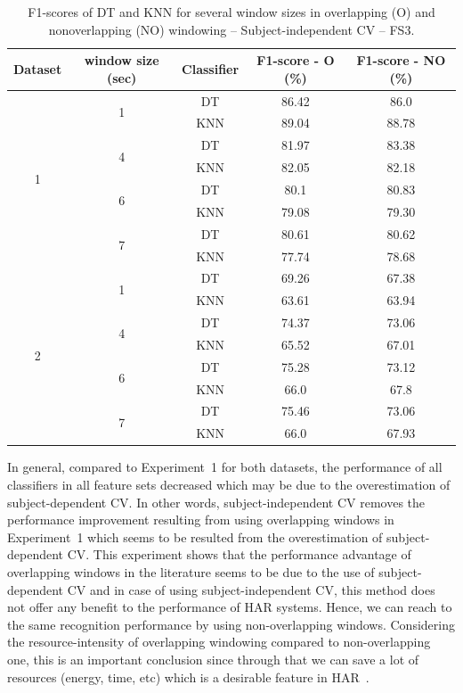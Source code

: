 \begin{table}[]
    \centering
\begin{tabular}{|>{}c|>{}c|>{}c|>{}c|>{}c|}
\hline 
Dataset & window size (sec) & Classifier & F1-score - O (\%) & F1-score - NO (\%)\tabularnewline
\hline 
\multirow{8}{*}{1} & \multirow{2}{*}{1} & DT & 86.42 & 86.0\tabularnewline
\cline{3-5} \cline{4-5} \cline{5-5} 
 &  & KNN & 89.04 & 88.78\tabularnewline
\cline{2-5} \cline{3-5} \cline{4-5} \cline{5-5} 
 & \multirow{2}{*}{4} & DT & 81.97 & 83.38\tabularnewline
\cline{3-5} \cline{4-5} \cline{5-5} 
 &  & KNN & 82.05 & 82.18\tabularnewline
\cline{2-5} \cline{3-5} \cline{4-5} \cline{5-5} 
 & \multirow{2}{*}{6} & DT & 80.1 & 80.83\tabularnewline
\cline{3-5} \cline{4-5} \cline{5-5} 
 &  & KNN & 79.08 & 79.30\tabularnewline
\cline{2-5} \cline{3-5} \cline{4-5} \cline{5-5} 
 & \multirow{2}{*}{7} & DT & 80.61 & 80.62\tabularnewline
\cline{3-5} \cline{4-5} \cline{5-5} 
 &  & KNN & 77.74 & 78.68\tabularnewline
\hline 
\multirow{8}{*}{2} & \multirow{2}{*}{1} & DT & 69.26 & 67.38\tabularnewline
\cline{3-5} \cline{4-5} \cline{5-5} 
 &  & KNN & 63.61 & 63.94\tabularnewline
\cline{2-5} \cline{3-5} \cline{4-5} \cline{5-5} 
 & \multirow{2}{*}{4} & DT & 74.37 & 73.06\tabularnewline
\cline{3-5} \cline{4-5} \cline{5-5} 
 &  & KNN & 65.52 & 67.01\tabularnewline
\cline{2-5} \cline{3-5} \cline{4-5} \cline{5-5} 
 & \multirow{2}{*}{6} & DT & 75.28 & 73.12\tabularnewline
\cline{3-5} \cline{4-5} \cline{5-5} 
 &  & KNN & 66.0 & 67.8\tabularnewline
\cline{2-5} \cline{3-5} \cline{4-5} \cline{5-5} 
 & \multirow{2}{*}{7} & DT & 75.46 & 73.06\tabularnewline
\cline{3-5} \cline{4-5} \cline{5-5} 
 &  & KNN & 66.0 & 67.93\tabularnewline
\hline 
\end{tabular}


    \caption{F1-scores of DT and KNN for several window sizes in overlapping (O) and nonoverlapping (NO) windowing -- Subject-independent CV -- FS3.}
    \label{tab:ds-fs3-f1score}
\end{table}

In general, compared to Experiment~1 for both datasets, the performance of all classifiers in all feature sets decreased which may be due to the overestimation of subject-dependent CV. In other words, subject-independent CV removes the performance improvement resulting from using overlapping windows in Experiment~1 which seems to be resulted from the overestimation of subject-dependent CV. This experiment shows that the performance advantage of overlapping windows in the literature seems to be due to the use of subject-dependent CV and in case of using subject-independent CV, this method does not offer any benefit to the performance of HAR systems. Hence, we can reach to the same recognition performance by using non-overlapping windows. Considering the resource-intensity of overlapping windowing compared to non-overlapping one,  this is an important conclusion since through that we can save a lot of resources (energy, time, etc) which is a desirable feature in HAR~\cite{lara2012survey}.   



